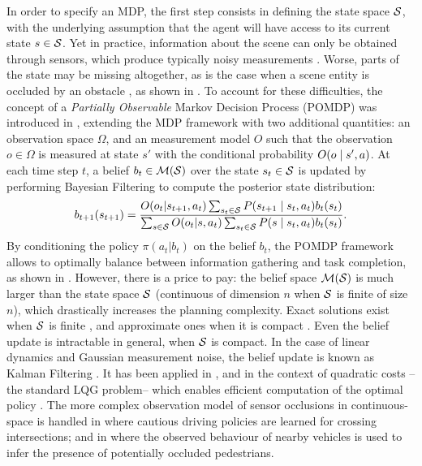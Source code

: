 In order to specify an \ac*{MDP}, the first step consists in defining the state space $\mathcal{S}$, with the underlying assumption that the agent will have access to its current state $s\in\mathcal{S}$. Yet in practice, information about the scene can only be obtained through sensors, which produce typically noisy measurements \citep{Ulbrich2013,Du2010}. Worse, parts of the state may be missing altogether, as is the case when a scene entity is occluded by an obstacle \citep[\eg][]{Brechtel2013,Bouton2018,Sun2019}, as shown in . To account for these difficulties, the concept of a \emph{Partially Observable} Markov Decision Process (POMDP) was introduced in \citep{Astrom1965}, extending the MDP framework with two additional quantities: an observation space $\Omega$, and an measurement model $O$ such that the observation $o\in\Omega$ is measured at state $s'$ with the conditional probability $O\lparen o\mid s',a\rparen$. At each time step $t$, a belief $b_t\in\mathcal{M}(\mathcal{S})$ over the state $s_t\in \mathcal{S}$ is updated by performing Bayesian Filtering to compute the posterior state distribution:
\begin{equation*}
b_{t+1}(s_{t+1}) = \frac{O(o_t|s_{t+1}, a_t)\sum_{s_{t}\in\mathcal{S}}P\lparen s_{t+1} \mid s_t, a_t\rparen b_t(s_t)}{\sum_{s\in\mathcal{S}} O(o_t|s, a_t)\sum_{s_{t}\in\mathcal{S}}P\lparen s \mid s_t, a_t\rparen b_t(s_t)}.
\end{equation*}
By conditioning the policy $\pi(a_t|b_t)$ on the belief $b_t$, the POMDP framework allows to optimally balance between information gathering and task completion, as shown in . However, there is a price to pay: the belief space $\mathcal{M}(\mathcal{S})$ is much larger than the state space $\mathcal{S}$ (\eg continuous of dimension $n$ when $\mathcal{S}$ is finite of size $n$), which drastically increases the planning complexity. Exact solutions exist when $\mathcal{S}$ is finite \citep{Pineau2003}, and approximate ones when it is compact \citep{Porta2006,Silver2010}. Even the belief update is intractable in general, when $\mathcal{S}$ is compact. In the case of linear dynamics and Gaussian measurement noise, the belief update is known as Kalman Filtering \citep{Kalman1960}. It has been applied in \citep[\eg]{Bry2011,Bouton2017,VanDenBerg2017}, and in the context of quadratic costs --\ie the standard LQG problem-- which enables efficient computation of the optimal policy \citep[see e.g.][]{Xu2014,VanDenBerg2011}. The more complex observation model of sensor occlusions in continuous-space is handled in \citep{Brechtel2013,Brechtel2014,Bouton2018} where cautious driving policies are learned for crossing intersections; and in \citep[][]{Sun2019} where the observed behaviour of nearby vehicles is used to infer the presence of potentially occluded pedestrians.
